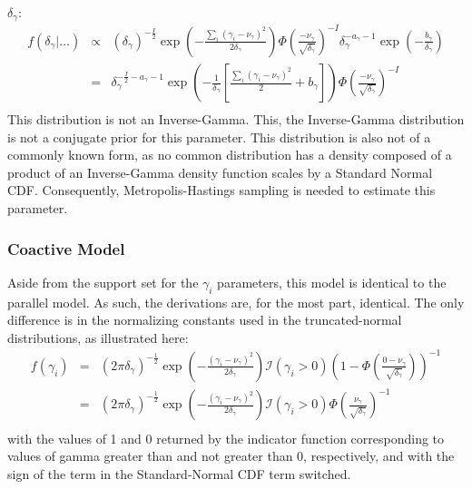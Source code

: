 $\delta_{\gamma}$:\\
\begin{eqnarray*}
f(\delta_{\gamma}|\dots)&\propto&(\delta_{\gamma})^{-\frac{I}{2}}\exp\left(-\frac{\sum_i(\gamma_i-\nu_{\gamma})^2}{2\delta_{\gamma}}\right)\Phi\left(\frac{-\nu_{\gamma}}{\sqrt{\delta_{\gamma}}}\right)^{-I}\delta_{\gamma}^{-a_{\gamma}-1}\exp\left(-\frac{b_{\gamma}}{\delta_{\gamma}}\right)\\
&=&\delta_{\gamma}^{-\frac{I}{2}-a_{\gamma}-1}\exp\left(-\frac{1}{\delta_{\gamma}}\left[\frac{\sum_i(\gamma_i-\nu_{\gamma})^2}{2}+b_{\gamma}\right]\right)\Phi\left(\frac{-\nu_{\gamma}}{\sqrt{\delta_{\gamma}}}\right)^{-I}\\
\end{eqnarray*}
This distribution is not an Inverse-Gamma.  This, the Inverse-Gamma
distribution is not a conjugate prior for this parameter.  This
distribution is also not of a commonly known form, as no common
distribution has a density composed of a product of an Inverse-Gamma
density function scales by a Standard Normal CDF.  Consequently,
Metropolis-Hastings sampling is needed to estimate this parameter.



\subsubsection{Coactive Model}

Aside from the support set for the $\gamma_i$ parameters, this model
is identical to the parallel model.  As such, the derivations are, for
the most part, identical.  The only difference is in the normalizing
constants used in the truncated-normal distributions, as illustrated
here:
\begin{eqnarray*}
f(\gamma_i)&=&(2\pi\delta_{\gamma})^{-\frac{1}{2}}\exp\left(-\frac{(\gamma_i-\nu_{\gamma})^2}{2\delta_{\gamma}}\right)\mathcal{I}\left(\gamma_i>0\right)\left(1-\Phi\left(\frac{0-\nu_{\gamma}}{\sqrt{\delta_{\gamma}}}\right)\right)^{-1}\\
&=&(2\pi\delta_{\gamma})^{-\frac{1}{2}}\exp\left(-\frac{(\gamma_i-\nu_{\gamma})^2}{2\delta_{\gamma}}\right)\mathcal{I}\left(\gamma_i>0\right)\Phi\left(\frac{\nu_{\gamma}}{\sqrt{\delta_{\gamma}}}\right)^{-1}\\
\end{eqnarray*}
with the values of 1 and 0 returned by the indicator function
corresponding to values of gamma greater than and not greater than 0,
respectively, and with the sign of the term in the Standard-Normal CDF
term switched.\\

